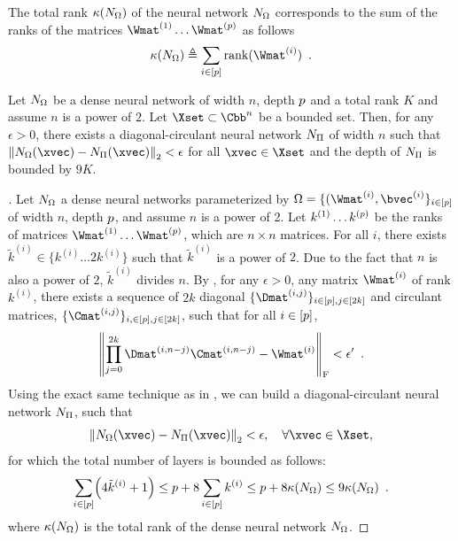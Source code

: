 \begin{definition}
  The total rank $\kappa(N_{\Omega})$ of the neural network $N_{\Omega}$ corresponds to the sum of the ranks of the matrices $\Wmat^{(1)} \ldots \Wmat^{(\depth)}$ as follows
  \begin{align}
    \kappa(\nn_{\Omega}) \triangleq \sum_{i \in [\depth]} \rank(\Wmat^{(i)}) \enspace.
  \end{align}
  \removespace
\end{definition}


\begin{maintheorem} \label{theorem:ch4-low_rank_nn}
  Let $N_\Omega$ be a dense neural network of width $n$, depth $p$ and a total rank $K$ and assume $n$ is a power of $2$.
  Let $\Xset \subset \Cn$ be a bounded set.
  Then, for any $\epsilon > 0$, there exists a diagonal-circulant neural network $N_\Pi$ of width $n$ such that $\norm{\nn_\Omega(\xvec) - \nn_\Pi(\xvec)}_2 < \epsilon$ for all $\xvec \in \Xset$ and the depth of $N_\Pi$ is bounded by $9K$.
\end{maintheorem}

\begin{proof}[]
  Let $N_\Omega$ a dense neural networks parameterized by $\Omega = \{( \Wmat^{(i)}, \bvec^{(i)} \}_{i \in [\depth]}$ of width $n$, depth $p$, and assume $n$ is a power of 2.
  Let $k^{(1)} \ldots k^{(p)}$ be the ranks of matrices $\Wmat^{(1)} \ldots \Wmat^{(\depth)}$, which are $n \times n$ matrices.
  For all $i$, there exists $\tilde{k}^{(i)} \in \{ k^{(i)} \ldots 2 k^{(i)} \}$ such that $\tilde{k}^{(i)}$ is a power of $2$.
  Due to the fact that $n$ is also a power of $2$, $\tilde{k}^{(i)}$ divides $n$.
  By , for any $\epsilon > 0$, any matrix $\Wmat^{(i)}$ of rank $k^{(i)}$, there exists a sequence of $2k$ diagonal $\{\Dmat^{(i, j)}\}_{i \in [\depth], j \in [2k]}$ and circulant matrices, $\{\Cmat^{(i, j)}\}_{i, \in [\depth], j \in [2k]}$, such that for all $i \in [p]$,
  \begin{equation}
    \norm{\prod_{j=0}^{2k} \Dmat^{(i,n-j)} \Cmat^{(i,n-j)} - \Wmat^{(i)}}_\fro < \epsilon' \enspace.
  \end{equation}
  Using the exact same technique as in , we can build a diagonal-circulant neural network $N_\Pi$, such that
  \begin{equation}
    \norm{ \nn_\Omega (\xvec) - \nn_\Pi (\xvec)}_2 < \epsilon, \quad \forall \xvec \in \Xset,
  \end{equation}
  for which the total number of layers is bounded as follows:
  \begin{equation}
    \sum_{i \in [\depth]} \left( 4 \tilde{k}^{(i)} + 1 \right) \le \depth + 8 \sum_{i \in [\depth]} k^{(i)} \le \depth + 8 \kappa(\nn_\Omega) \le 9 \kappa(\nn_\Omega) \enspace. 
  \end{equation}
  where $\kappa(N_\Omega)$ is the total rank of the dense neural network $N_\Omega$.
\end{proof}


